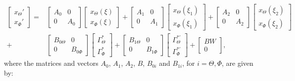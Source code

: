 \documentclass[../main.tex]{subfiles}
\begin{document}
	\begin{align}
		\begin{bmatrix}
			x_\Theta' \\
			x_\Phi'
		\end{bmatrix} =&
		\begin{bmatrix}
			A_0 & 0 \\
			0 & A_0
		\end{bmatrix}
		\begin{bmatrix}
			x_\Theta(\xi) \\
			x_\Phi(\xi)
		\end{bmatrix} + 
		\begin{bmatrix}
		A_1 & 0 \\
		0 & A_1
		\end{bmatrix}
		\begin{bmatrix}
		x_\Theta(\xi_1) \\
		x_\Phi(\xi_1)
		\end{bmatrix} +
		\begin{bmatrix}
		A_2 & 0 \\
		0 & A_2
		\end{bmatrix}
		\begin{bmatrix}
		x_\Theta(\xi_2) \\
		x_\Phi(\xi_2)
		\end{bmatrix} \nonumber\\
		+&
	   \begin{bmatrix}
		B_{0\Theta} & 0\\
		0 & B_{0\Phi}
		\end{bmatrix} 
		\begin{bmatrix}
		\Gamma_\Theta^* \\
		\Gamma_\Phi^*
		\end{bmatrix} +
		\begin{bmatrix}
		B_{1\Theta} & 0\\
		0 & B_{1\Phi}
		\end{bmatrix} 
		\begin{bmatrix}
		\Gamma_\Theta^{*'} \\
		\Gamma_\Phi^{*'}
		\end{bmatrix} + 
		\begin{bmatrix}
		BW \\
		0
		\end{bmatrix},
		\label{eq:systemstatespace}	
	\end{align}
	where the matrices and vectors $A_0$, $A_1$, $A_2$, $B$, $B_{0i}$ and $B_{1i}$, for $i = \Theta, \Phi$, are given by:
\end{document}
